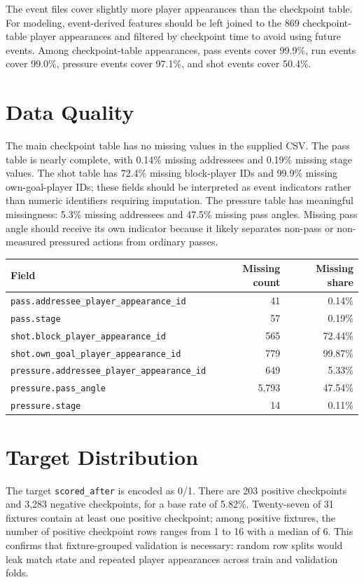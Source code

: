 \documentclass[11pt]{article}
\begin{document}
The event files cover slightly more player appearances than the checkpoint table.
For modeling, event-derived features should be left joined to the 869 checkpoint-table player appearances and filtered by checkpoint time to avoid using future events.
Among checkpoint-table appearances, pass events cover 99.9\%, run events cover 99.0\%, pressure events cover 97.1\%, and shot events cover 50.4\%.

\section{Data Quality}
The main checkpoint table has no missing values in the supplied CSV.
The pass table is nearly complete, with 0.14\% missing addressees and 0.19\% missing stage values.
The shot table has 72.4\% missing block-player IDs and 99.9\% missing own-goal-player IDs; these fields should be interpreted as event indicators rather than numeric identifiers requiring imputation.
The pressure table has meaningful missingness: 5.3\% missing addressees and 47.5\% missing pass angles.
Missing pass angle should receive its own indicator because it likely separates non-pass or non-measured pressured actions from ordinary passes.

\begin{longtable}{lrr}
\toprule
Field & Missing count & Missing share \\
\midrule
\texttt{pass.addressee\_player\_appearance\_id} & 41 & 0.14\% \\
\texttt{pass.stage} & 57 & 0.19\% \\
\texttt{shot.block\_player\_appearance\_id} & 565 & 72.44\% \\
\texttt{shot.own\_goal\_player\_appearance\_id} & 779 & 99.87\% \\
\texttt{pressure.addressee\_player\_appearance\_id} & 649 & 5.33\% \\
\texttt{pressure.pass\_angle} & 5,793 & 47.54\% \\
\texttt{pressure.stage} & 14 & 0.11\% \\
\bottomrule
\end{longtable}

\section{Target Distribution}
The target \texttt{scored\_after} is encoded as 0/1.
There are 203 positive checkpoints and 3,283 negative checkpoints, for a base rate of 5.82\%.
Twenty-seven of 31 fixtures contain at least one positive checkpoint; among positive fixtures, the number of positive checkpoint rows ranges from 1 to 16 with a median of 6.
This confirms that fixture-grouped validation is necessary: random row splits would leak match state and repeated player appearances across train and validation folds.
\end{document}
